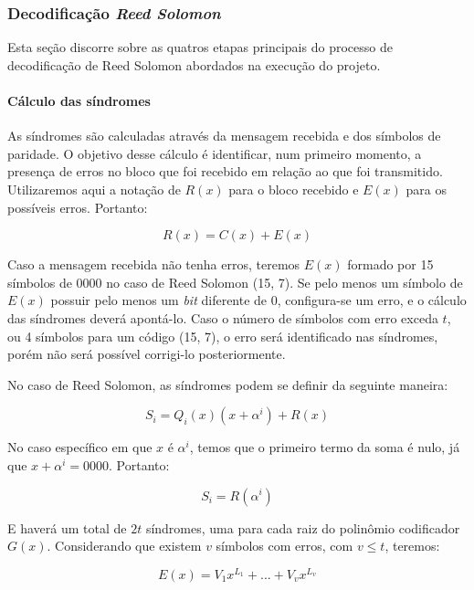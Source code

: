 	\subsubsection{Decodificação \textit{Reed Solomon}}
	
	Esta seção discorre sobre as quatros etapas principais do processo de decodificação de Reed Solomon abordados na execução do projeto.
	
	\paragraph{Cálculo das síndromes}
	
	As síndromes são calculadas através da mensagem recebida e dos símbolos de paridade. O objetivo desse cálculo é identificar, num primeiro momento, a presença de erros no bloco que foi recebido em relação ao que foi transmitido. Utilizaremos aqui a notação de $R(x)$ para o bloco recebido e $E(x)$ para os possíveis erros. Portanto:
	
	\begin{equation}
	R(x) = C(x) + E(x)
	\end{equation}
	
	Caso a mensagem recebida não tenha erros, teremos $E(x)$ formado por 15 símbolos de 0000 no caso de Reed Solomon (15, 7). Se pelo menos um símbolo de $E(x)$ possuir pelo menos um \textit{bit} diferente de 0, configura-se um erro, e o cálculo das síndromes deverá apontá-lo. Caso o número de símbolos com erro exceda $t$, ou 4 símbolos para um código (15, 7), o erro será identificado nas síndromes, porém não será possível corrigi-lo posteriormente.
	
	No caso de Reed Solomon, as síndromes podem se definir da seguinte maneira:
	
	\begin{equation}
	S_{i} = Q_{i}(x)(x + \alpha^{i}) + R(x)
	\end{equation}
	
	No caso específico em que $x$ é $\alpha^{i}$, temos que o primeiro termo da soma é nulo, já que $x + \alpha^{i} = 0000$. Portanto:
	
	\begin{equation}
	S_{i} = R(\alpha^{i})
	\end{equation}
	
	E haverá um total de $2t$ síndromes, uma para cada raiz do polinômio codificador $G(x)$. Considerando que existem $v$ símbolos com erros, com $v \leq t$, teremos:
	
	\begin{equation}
	E(x) = V_{1}x^{L_{1}} + ... + V_{v}x^{L_{v}}
	\end{equation}
	
